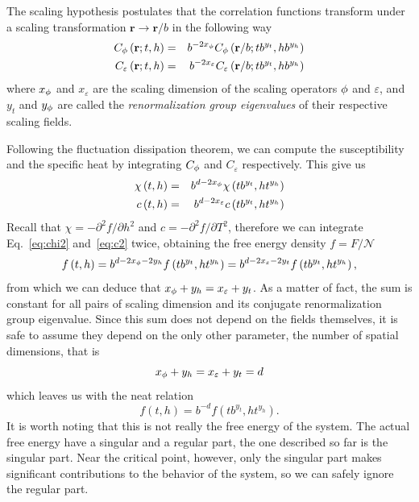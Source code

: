 The scaling hypothesis postulates that the correlation functions transform
under a scaling transformation $\mathbf{r}\rightarrow\mathbf{r}/b$ in the
following way
\begin{eqnarray}
    \label{eq:scal}
    C_{\phi}\left(\mathbf{r};t,h\right) & = &
    b^{-2x_{\phi}}C_{\phi}\left(\mathbf{r}/b;tb^{y_{t}},hb^{y_{h}}\right)\\
    C_{\varepsilon}\left(\mathbf{r};t,h\right) & = &
    b^{-2x_{\varepsilon}}C_{\varepsilon}\left(\mathbf{r}/b;tb^{y_{t}},hb^{y_{h}}\right)
\end{eqnarray}
where $x_\phi$ and $x_\varepsilon$ are the scaling dimension of the scaling
operators $\phi$ and $\varepsilon$, and $y_t$ and $y_\phi$ are called the
\textit{renormalization group eigenvalues} of their respective scaling fields.

Following the fluctuation dissipation theorem, we can compute the susceptibility
and the specific heat by integrating $C_\phi$ and $C_\varepsilon$ respectively.
This give us
\begin{eqnarray}
    \label{eq:chi2}
    \chi\left(t,h\right) & = & b^{d-2x_{\phi}}\chi\left(tb^{y_{t}},ht^{y_{h}}\right)\\
    \label{eq:c2}
    c\left(t,h\right) & = & b^{d-2x_{\varepsilon}}c\left(tb^{y_{t}},ht^{y_{h}}\right)
\end{eqnarray}
Recall that $\chi=-\partial^2 f/\partial h^2$ and $c=-\partial^2 f/\partial
T^2$, therefore we can integrate Eq.~\ref{eq:chi2} and~\ref{eq:c2} twice,
obtaining the free energy density $f=F/\mathcal{N}$
\begin{equation}
    f\left(t,h\right)=
    b^{d-2x_{\phi}-2y_{h}}f\left(tb^{y_{t}},ht^{y_{h}}\right)=
    b^{d-2x_{\varepsilon}-2y_{t}}f\left(tb^{y_{t}},ht^{y_{h}}\right),
\end{equation}
from which we can deduce that $x_\phi+y_h = x_\varepsilon+y_t$. As a matter of
fact, the sum is constant for all pairs of scaling dimension and its conjugate
renormalization group eigenvalue. Since this sum does not depend on the fields
themselves, it is safe to assume they depend on the only other parameter, the
number of spatial dimensions, that is
\begin{equation}
    \label{eq:scald}
    x_\phi+y_h = x_\varepsilon+y_t = d
\end{equation}
which leaves us with the neat relation
\begin{equation}
    f\left(t,h\right)=b^{-d}f\left(tb^{y_{t}},ht^{y_{h}}\right).
\end{equation}
It is worth noting that this is not really the free energy of the system. The
actual free energy have a singular and a regular part, the one described so
far is the singular part. Near the critical point, however, only the singular
part makes significant contributions to the behavior of the system, so we can
safely ignore the regular part.

